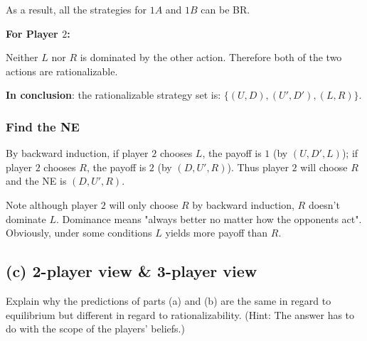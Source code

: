 \documentclass{article}
\begin{document}
As a result, all the strategies for $1A$ and $1B$ can be BR.

\medskip

\textbf{For Player $2$:} 

Neither $L$ nor $R$ is dominated by the other action. Therefore both of the two 
actions are rationalizable.

\medskip

\textbf{In conclusion}: the rationalizable strategy set is: $\{(U,D),(U',D'),(L,R)\}$.

\subsubsection*{Find the NE}
By backward induction, if player $2$ chooses $L$, the payoff is $1$ (by $(U,D',L)$); if player $2$ chooses $R$, the payoff is $2$ (by $(D,U',R)$). Thus player $2$ will choose $R$ and the NE is $(D,U',R)$.

\begin{mdframed}[backgroundcolor=blue!20,linecolor=white]
Note although player $2$ will only choose $R$ by backward induction, $R$ doesn't dominate $L$. Dominance means "always better no matter how the opponents act". Obviously, under some conditions $L$ yields more payoff than $R$.
\end{mdframed}



\subsection*{(c) 2-player view \& 3-player view}
Explain why the predictions of parts (a) and (b) are the same in regard
to equilibrium but different in regard to rationalizability. (Hint: The
answer has to do with the scope of the players' beliefs.)
\end{document}
